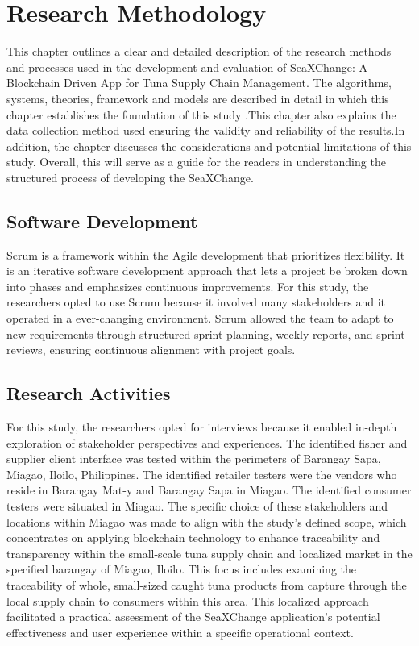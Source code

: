 \chapter{Research Methodology}
\vspace*{-1cm}  %
This chapter outlines a clear and detailed description of the research methods and processes used in the development and evaluation of SeaXChange: A Blockchain Driven App for Tuna Supply Chain Management. The algorithms, systems, theories, framework and models are described in detail in which this chapter establishes the foundation of this study .This chapter also explains the data collection method used ensuring the validity and reliability of the results.In addition, the chapter discusses the considerations and potential limitations of this study. Overall, this will serve as a guide for the readers in understanding the structured process of developing the SeaXChange.

\section{Software Development}
Scrum is a framework within the Agile development that prioritizes flexibility. It is an iterative software development approach that lets a project be broken down into phases and emphasizes continuous improvements. For this study, the researchers opted to use Scrum  because it involved many stakeholders and it operated in a ever-changing environment. Scrum allowed the team to adapt to new requirements through structured sprint planning, weekly reports, and sprint reviews, ensuring continuous alignment with project goals.

\section{Research Activities}
For this study, the researchers opted for interviews because it enabled in-depth exploration of stakeholder perspectives and experiences. The identified fisher and supplier client interface was tested within the perimeters of Barangay Sapa, Miagao, Iloilo, Philippines. The identified retailer testers were the vendors who reside in Barangay Mat-y and Barangay Sapa in Miagao. The identified consumer testers were situated in Miagao. The specific choice of these stakeholders and locations within Miagao was made to align with the study's defined scope, which concentrates on applying blockchain technology to enhance traceability and transparency within the small-scale tuna supply chain and localized market in the specified barangay of Miagao, Iloilo. This focus includes examining the traceability of whole, small-sized caught tuna products from capture through the local supply chain to consumers within this area. This localized approach facilitated a practical assessment of the SeaXChange application's potential effectiveness and user experience within a specific operational context.

